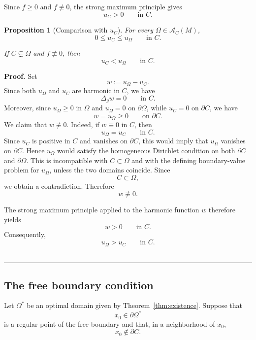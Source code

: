 \documentclass{article}
\renewcommand{\boxed}[1]{#1}
\newtheorem{proposition}[theorem]{Proposition}
\newenvironment{proof}[1][Proof]{\textbf{#1.} }{\ \rule{0.5em}{0.5em}}
\begin{document}
Since $f\geq0$ and $f\not\equiv0$, the strong maximum principle gives
\begin{equation}
u_C>0
\qquad\text{in }C.
\label{eq:uC-positive}
\end{equation}

\begin{proposition}[Comparison with $u_C$]
\label{prop:comparison-C}
For every $\Omega\in\mathcal A_C(M)$,
\begin{equation}
0\leq u_C\leq u_\Omega
\qquad\text{in }C.
\label{eq:uC-uOmega-comparison}
\end{equation}

If $C\subsetneq\Omega$ and $f\not\equiv0$, then
\begin{equation}
u_C<u_\Omega
\qquad\text{in }C.
\label{eq:strict-comparison-C}
\end{equation}
\end{proposition}

\begin{proof}
Set
\[
w:=u_{\Omega}-u_C.
\]
Since both $u_{\Omega}$ and $u_C$ are harmonic in $C$, we have
\[
\Delta_g w=0
\qquad\text{in }C.
\]
Moreover, since $u_{\Omega}\geq0$ in $\Omega$ and
$u_{\Omega}=0$ on $\partial\Omega$, while
$u_C=0$ on $\partial C$, we have
\[
w=u_{\Omega}\geq0
\qquad\text{on }\partial C.
\]
We claim that $w\not\equiv0$. Indeed, if $w\equiv0$ in $C$, then
\[
u_{\Omega}=u_C
\qquad\text{in }C.
\]
Since $u_C$ is positive in $C$ and vanishes on $\partial C$, this would
imply that $u_{\Omega}$ vanishes on $\partial C$. Hence $u_{\Omega}$
would satisfy the homogeneous Dirichlet condition on both
$\partial C$ and $\partial\Omega$. This is incompatible with
$C\subset\Omega$ and with the defining boundary-value problem for
$u_{\Omega}$, unless the two domains coincide. Since
\[
C\subset\Omega,
\]
we obtain a contradiction. Therefore
\[
w\not\equiv0.
\]

The strong maximum principle applied to the harmonic function $w$
therefore yields
\[
w>0
\qquad\text{in }C.
\]
Consequently,
\[
\boxed{
u_{\Omega}>u_C
\qquad\text{in }C.
}
\]
\end{proof}

\subsection{The free boundary condition}
\label{subsec:free-boundary}

Let $\Omega^\ast$ be an optimal domain given by
Theorem~\ref{thm:existence}. Suppose that
\[
x_0\in\partial\Omega^\ast
\]
is a regular point of the free boundary and that, in a neighborhood of
$x_0$,
\[
x_0\notin\partial C.
\]
\end{document}
